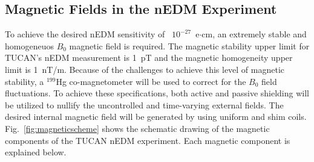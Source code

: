 





\subsection{Magnetic Fields in the nEDM Experiment}
To achieve the desired nEDM sensitivity of ~$10^{-27}$~e$\cdot$cm, an
extremely stable and homogeneuos $B_0$ magnetic field is required.
The magnetic stability upper limit for TUCAN's nEDM measurement is
1~pT and the magnetic homogeneity upper limit is 1~nT/m.
Because of the challenges to achieve this level of magnetic stability,
a $^{199}$Hg co-magnetometer will be used to correct for the $B_0$
field fluctuations. To achieve these specifications, both active and
passive shielding will be utilized to nullify the uncontrolled and
time-varying external fields. The desired internal magnetic field will
be generated by using uniform and shim
coils. Fig.~\ref{fig:magneticscheme} shows the schematic drawing of
the magnetic components of the TUCAN nEDM experiment. Each magnetic
component is explained below.

